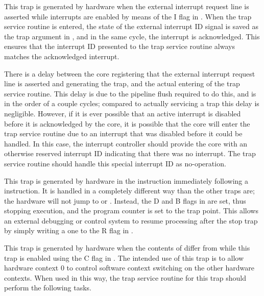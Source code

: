 This trap is generated by hardware when the external interrupt request line is
asserted while interrupts are enabled by means of the I flag in . When
the trap service routine is entered, the state of the external interrupt ID
signal is saved as the trap argument in , and in the same cycle, the
interrupt is acknowledged. This ensures that the interrupt ID presented to the
trap service routine always matches the acknowledged interrupt.

There is a delay between the core registering that the external interrupt
request line is asserted and generating the trap, and the actual entering of the
trap service routine. This delay is due to the pipeline flush required to do
this, and is in the order of a couple cycles; compared to actually servicing a
trap this delay is negligible. However, if it is ever possible that an active
interrupt is disabled before it is acknowledged by the core, it is possible that
the core will enter the trap service routine due to an interrupt that was
disabled before it could be handled. In this case, the interrupt controller
should provide the core with an otherwise reserved interrupt ID indicating that
there was no interrupt. The trap service routine should handle this special
interrupt ID as no-operation.


\debug{} %

This trap is generated by hardware in the instruction immediately following a
 instruction. It is handled in a completely different way than the
other traps are; the hardware will not jump to  or . Instead,
the D and B flags in  are set, thus stopping execution, and the
program counter is set to the trap point. This allows an external debugging or
control system to resume processing after the stop trap by simply writing
a one to the R flag in .



This trap is generated by hardware when the contents of  differ from
 while this trap is enabled using the C flag in . The
intended use of this trap is to allow hardware context 0 to control software
context switching on the other hardware contexts. When used in this way, the
trap service routine for this trap should perform the following tasks.

